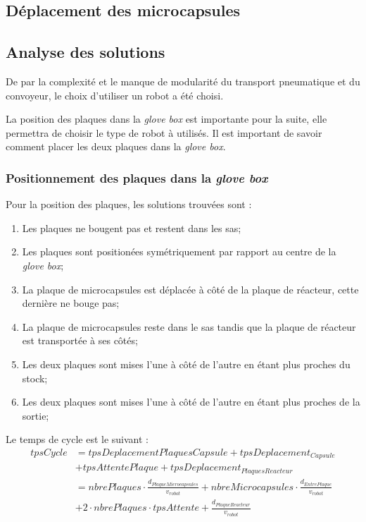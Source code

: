 \subsection{Déplacement des microcapsules}


\subsection{Analyse des solutions}
De par la complexité et le manque de modularité du transport pneumatique et du convoyeur, le choix d'utiliser un robot a été choisi.

La position des plaques dans la \textit{glove box} est importante pour la suite, elle permettra de choisir le type de robot à utilisés.
Il est important de savoir comment placer les deux plaques dans la \textit{glove box}.
\subsubsection{Positionnement des plaques dans la \textit{glove box}}
Pour la position des plaques, les solutions trouvées sont : 
\begin{enumerate}
    \item Les plaques ne bougent pas et restent dans les sas;
    \item Les plaques sont positionées symétriquement par rapport au centre de la \textit{glove box};
    \item La plaque de microcapsules est déplacée à côté de la plaque de réacteur, cette dernière ne bouge pas;
    \item La plaque de microcapsules reste dans le sas tandis que la plaque de réacteur est transportée à ses côtés;
    \item Les deux plaques sont mises l'une à côté de l'autre en étant plus proches du stock;
    \item Les deux plaques sont mises l'une à côté de l'autre en étant plus proches de la sortie;
\end{enumerate}
Le temps de cycle est le suivant :
\begin{align*}
    tpsCycle &= tpsDeplacementPlaquesCapsule + tpsDeplacement_{Capsule} \\
    &+ tpsAttentePlaque + tpsDeplacement_{PlaquesReacteur}\\
    &= nbrePlaques\cdot \frac{d_{PlaqueMicrocapsules}}{v_{robot}} + nbreMicrocapsules\cdot \frac{d_{EntrePlaque}}{v_{robot}} \\
    &+ 2\cdot nbrePlaques\cdot tpsAttente + \frac{d_{PlaqueReacteur}}{v_{robot}}
\end{align*}


